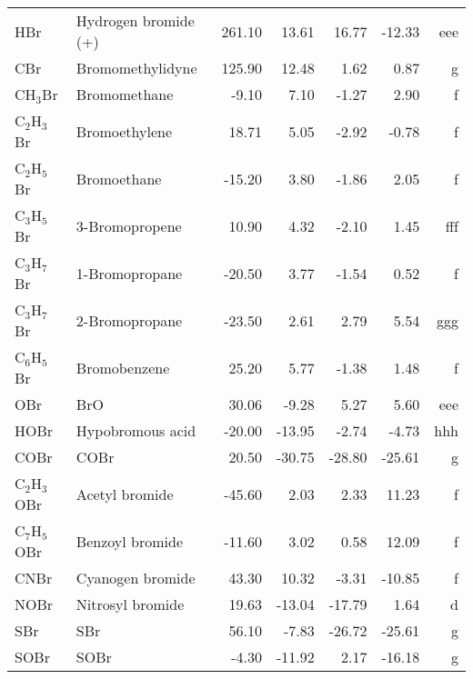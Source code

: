 \begin{table}
\begin{center}
\begin{tabular}{llrrrrr}
 HBr         & Hydrogen bromide (+)            &   261.10    &    13.61  &    16.77  &   -12.33  &    eee\\
 CBr         & Bromomethylidyne                &   125.90    &    12.48  &     1.62  &     0.87  &      g\\
 CH$_3$Br       & Bromomethane                    &    -9.10    &     7.10  &    -1.27  &     2.90  &      f\\
 C$_2$H$_3$Br      & Bromoethylene                   &    18.71    &     5.05  &    -2.92  &    -0.78  &      f\\
 C$_2$H$_5$Br      & Bromoethane                     &   -15.20    &     3.80  &    -1.86  &     2.05  &      f\\
 C$_3$H$_5$Br      & 3-Bromopropene                  &    10.90    &     4.32  &    -2.10  &     1.45  &    fff\\
 C$_3$H$_7$Br      & 1-Bromopropane                  &   -20.50    &     3.77  &    -1.54  &     0.52  &      f\\
 C$_3$H$_7$Br      & 2-Bromopropane                  &   -23.50    &     2.61  &     2.79  &     5.54  &    ggg\\
 C$_6$H$_5$Br      & Bromobenzene                    &    25.20    &     5.77  &    -1.38  &     1.48  &      f\\
 OBr         & BrO                             &    30.06    &    -9.28  &     5.27  &     5.60  &    eee\\
 HOBr        & Hypobromous acid                &   -20.00    &   -13.95  &    -2.74  &    -4.73  &    hhh\\
 COBr        & COBr                            &    20.50    &   -30.75  &   -28.80  &   -25.61  &      g\\
 C$_2$H$_3$OBr     & Acetyl bromide                  &   -45.60    &     2.03  &     2.33  &    11.23  &      f\\
 C$_7$H$_5$OBr     & Benzoyl bromide                 &   -11.60    &     3.02  &     0.58  &    12.09  &      f\\
 CNBr        & Cyanogen bromide                &    43.30    &    10.32  &    -3.31  &   -10.85  &      f\\
 NOBr        & Nitrosyl bromide                &    19.63    &   -13.04  &   -17.79  &     1.64  &      d\\
 SBr         & SBr                             &    56.10    &    -7.83  &   -26.72  &   -25.61  &      g\\
 SOBr        & SOBr                            &    -4.30    &   -11.92  &     2.17  &   -16.18  &      g\\

\end{tabular}
\end{center}
\end{table}
